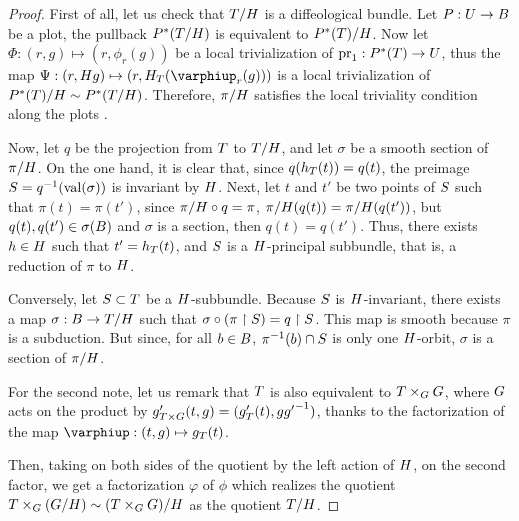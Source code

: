 \begin{proof}
  First of all,
  let us check that $\T/\H$ is a diffeological bundle.
  Let $\P : \U \to \B$ be a plot,
  the pullback $\P^*(\T/\H)$ is equivalent to $\P^*(\T)/\H$.
  Now let $\Phi : (r,g) \mapsto (r, \phi_r(g))$ be a local trivialization of $\pr_1 : \P^*(\T) \to \U$,
  thus the map $\Psi : (r,\H g) \mapsto (r, \H_\T(\phi_r(g)))$ is a local trivialization of $\P^*(\T)/\H \sim \P^*(\T/\H)$.
  Therefore,
  $\pi/\H$ satisfies the local triviality condition along the plots .
  
  Now,
  let $q$ be the projection from $\T$ to $\T/\H$,
  and let $\sigma$ be a smooth section of $\pi/\H$.
  On the one hand,
  it is clear that,
  since $q(h_\T(t)) = q(t)$,
  the preimage $\S = q^{-1}(\Val(\sigma))$ is invariant by $\H$.
  Next,
  let $t$ and $t'$ be two points of $\S$ such that $\pi(t) = \pi(t')$,
  since $\pi/\H \circ q = \pi$, $\pi/\H(q(t)) = \pi/\H(q(t'))$,
  but $q(t), q(t') \in \sigma(\B)$ and $\sigma$ is a section,
  then $q(t)= q(t')$.
  Thus,
  there exists $h \in \H$ such that $t' = h_\T(t)$,
  and $\S$ is a $\H$-principal subbundle,
  that is,
  a reduction of $\pi$ to $\H$.
  
  Conversely,
  let $\S \subset \T$ be a $\H$-subbundle.
  Because $\S$ is $\H$-invariant,
  there exists a map $\sigma : \B \to \T/\H$ such that $\sigma \circ (\pi \restriction \S) = q \restriction \S$.
  This map is smooth because $\pi$ is a subduction.
  But since,
  for all $b \in \B$, $\pi^{-1}(b) \cap \S$ is only one $\H$-orbit,
  $\sigma$ is a section of $\pi/\H$.
  
  For the second note,
  let us remark that $\T$ is also equivalent to $\T \times_\G \G$,
  where $\G$ acts on the product by $g'_{\T \times \G} (t,g) = (g'_\T(t), g{g'}^{-1})$,
  thanks to the factorization of the map $\phi : (t,g) \mapsto g_\T(t)$.
  \begin{center}
  \end{center}
  Then,
  taking on both sides of the quotient by the left action of $\H$,
  on the second factor,
  we get a factorization $\varphi$ of $\phi$ which realizes the quotient $\T \times_\G (\G/\H) \sim (\T \times_\G \G)/\H$ as the quotient $\T/\H$.
\end{proof}

